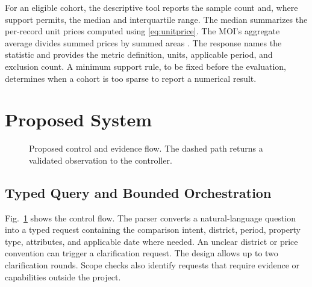 \documentclass[conference]{IEEEtran}
\begin{document}
For an eligible cohort, the descriptive tool reports the sample count and, where support permits, the median and interquartile range. The median summarizes the per-record unit prices computed using \eqref{eq:unitprice}. The MOI's aggregate average divides summed prices by summed areas \cite{moi}. The response names the statistic and provides the metric definition, units, applicable period, and exclusion count. A minimum support rule, to be fixed before the evaluation, determines when a cohort is too sparse to report a numerical result.

\section{Proposed System}
\label{sec:method}
\begin{figure}[t]
\centering
{}
\caption{Proposed control and evidence flow. The dashed path returns a validated observation to the controller.}
\label{fig:architecture}
\end{figure}

\subsection{Typed Query and Bounded Orchestration}
Fig.~\ref{fig:architecture} shows the control flow. The parser converts a natural-language question into a typed request containing the comparison intent, district, period, property type, attributes, and applicable date where needed. An unclear district or price convention can trigger a clarification request. The design allows up to two clarification rounds. Scope checks also identify requests that require evidence or capabilities outside the project.
\end{document}
